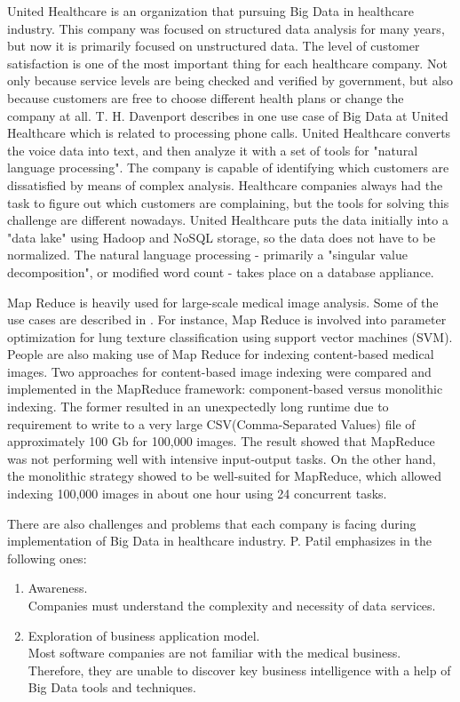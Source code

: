 \documentclass[runningheads]{llncs}
\begin{document}
United Healthcare is an organization that pursuing Big Data in healthcare industry. This company was focused on structured data analysis for many years, but now it is primarily focused on unstructured data. The level of customer satisfaction is one of the most important thing for each healthcare company. Not only because service levels are being checked and verified by government, but also because customers are free to choose different health plans or change the company at all. T. H. Davenport describes in \cite{DAVENPORT} one use case of Big Data at United Healthcare which is related to processing phone calls. United Healthcare converts the voice data into text, and then analyze it with a set of tools for "natural language processing". The company is capable of identifying which customers are dissatisfied by means of complex analysis. Healthcare companies always had the task to figure out which customers are complaining, but the tools for solving this challenge are different nowadays. United Healthcare puts the data initially into a "data lake" using Hadoop and NoSQL storage, so the data does not have to be normalized. The natural language processing - primarily a "singular value decomposition", or modified word count - takes place on a database appliance. 

Map Reduce is heavily used for large-scale medical image analysis. Some of the use cases are described in \cite{HEALTHARTICLE}. For instance, Map Reduce is involved into parameter optimization for lung texture classification using support vector machines (SVM). People are also making use of Map Reduce for indexing content-based medical images. Two approaches for content-based image indexing were compared
and implemented in the MapReduce framework: component-based versus monolithic indexing. The former resulted in an unexpectedly long runtime due to requirement to write to a very large CSV(Comma-Separated Values) file of approximately 100 Gb for 100,000 images. The result showed that MapReduce was not performing well with intensive input-output tasks. On the other hand, the monolithic strategy showed to be well-suited for MapReduce, which allowed indexing 100,000 images in about one hour using 24 concurrent tasks. 

There are also challenges and problems that each company is facing during implementation of Big Data in healthcare industry. P. Patil emphasizes in \cite{HEALTHARTICLE} the following ones:

\begin{enumerate}
\item Awareness.\\ 

Companies must understand the complexity and necessity of data services.\\
\item Exploration of business application model.\\

Most software companies are not familiar with the medical business. Therefore, they are unable to discover key business intelligence with a help of Big Data tools and techniques.
\end{enumerate}
\end{document}
